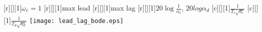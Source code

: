 \documentclass{standalone}
\begin{document}
[r][][1]{\small $\omega_c=1$}
[r][][1]{\small max lead}
[r][][1]{\small max lag}
[r][][1]{\small $20\log \frac{1}{\alpha_i}$,  $20log \alpha_d$}
[c][][1]{\small $\frac{1}{T_i\sqrt{a_i}}$}
[c][][1]{\small $\frac{1}{T_d\sqrt{a_d}}$}
\texttt{[image: lead\_lag\_bode.eps]}
\end{document}

